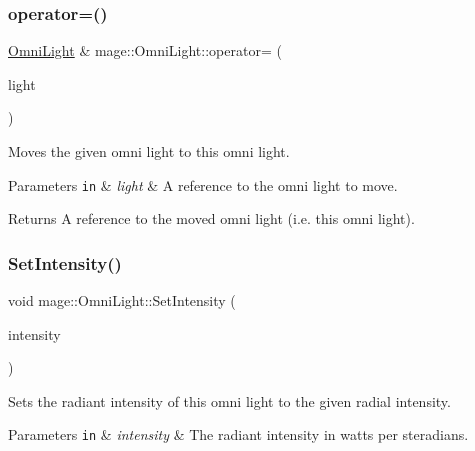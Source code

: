 \subsubsection{\texorpdfstring{operator=()}{operator=()}\hspace{0.1cm}{\footnotesize\ttfamily [2/2]}}
{\footnotesize\ttfamily \hyperlink{classmage_1_1_omni_light}{Omni\+Light} \& mage\+::\+Omni\+Light\+::operator= (\begin{DoxyParamCaption}\item[{\hyperlink{classmage_1_1_omni_light}{Omni\+Light} \&\&}]{light }\end{DoxyParamCaption})\hspace{0.3cm}{\ttfamily [default]}}

Moves the given omni light to this omni light.


\begin{DoxyParams}[1]{Parameters}
\mbox{\tt in}  & {\em light} & A reference to the omni light to move. \\
\hline
\end{DoxyParams}
\begin{DoxyReturn}{Returns}
A reference to the moved omni light (i.\+e. this omni light). 
\end{DoxyReturn}
\hypertarget{classmage_1_1_omni_light_add3fece8f288f4d4b55357143faa490b}{}\label{classmage_1_1_omni_light_add3fece8f288f4d4b55357143faa490b} 
\subsubsection{\texorpdfstring{Set\+Intensity()}{SetIntensity()}}
{\footnotesize\ttfamily void mage\+::\+Omni\+Light\+::\+Set\+Intensity (\begin{DoxyParamCaption}\item[{\hyperlink{namespacemage_aa97e833b45f06d60a0a9c4fc22ae02c0}{F32}}]{intensity }\end{DoxyParamCaption})\hspace{0.3cm}{\ttfamily [noexcept]}}

Sets the radiant intensity of this omni light to the given radial intensity.


\begin{DoxyParams}[1]{Parameters}
\mbox{\tt in}  & {\em intensity} & The radiant intensity in watts per steradians. \\
\hline
\end{DoxyParams}
\hypertarget{classmage_1_1_omni_light_a03f277ecf566147aa54c95816871de10}{}\label{classmage_1_1_omni_light_a03f277ecf566147aa54c95816871de10} 
